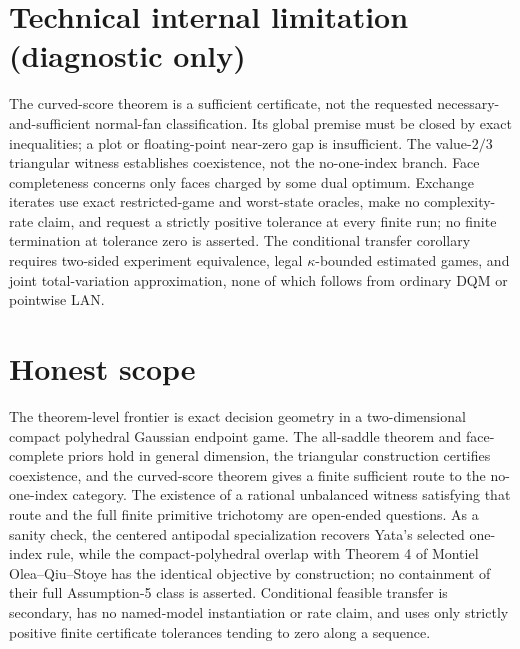 \documentclass{article}
\begin{document}
\section*{Technical internal limitation (diagnostic only)}

The curved-score theorem is a sufficient certificate, not the requested necessary-and-sufficient normal-fan classification. Its global premise must be closed by exact inequalities; a plot or floating-point near-zero gap is insufficient. The value-\(2/3\) triangular witness establishes coexistence, not the no-one-index branch. Face completeness concerns only faces charged by some dual optimum. Exchange iterates use exact restricted-game and worst-state oracles, make no complexity-rate claim, and request a strictly positive tolerance at every finite run; no finite termination at tolerance zero is asserted. The conditional transfer corollary requires two-sided experiment equivalence, legal \(\kappa\)-bounded estimated games, and joint total-variation approximation, none of which follows from ordinary DQM or pointwise LAN.

\section{Honest scope}

The theorem-level frontier is exact decision geometry in a two-dimensional compact polyhedral Gaussian endpoint game. The all-saddle theorem and face-complete priors hold in general dimension, the triangular construction certifies coexistence, and the curved-score theorem gives a finite sufficient route to the no-one-index category. The existence of a rational unbalanced witness satisfying that route and the full finite primitive trichotomy are open-ended questions. As a sanity check, the centered antipodal specialization recovers Yata's selected one-index rule, while the compact-polyhedral overlap with Theorem 4 of Montiel Olea--Qiu--Stoye has the identical objective by construction; no containment of their full Assumption-5 class is asserted. Conditional feasible transfer is secondary, has no named-model instantiation or rate claim, and uses only strictly positive finite certificate tolerances tending to zero along a sequence.
\end{document}
